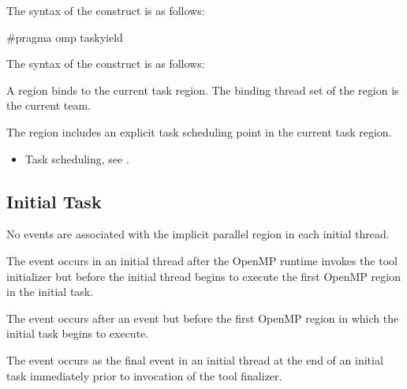 \syntax
\begin{ccppspecific}
The syntax of the  construct is as follows:

\begin{ompcPragma}
#pragma omp taskyield 
\end{ompcPragma}
\end{ccppspecific}

\begin{fortranspecific}
The syntax of the  construct is as follows:

\end{fortranspecific}

\binding
A  region binds to the current task region. The binding thread set of the
 region is the current team.

\descr
The  region includes an explicit task scheduling point in the current task
region.

\crossreferences
\begin{itemize}
\item Task scheduling, see
.
\end{itemize}











\subsection{Initial Task}

\events
No events are associated with the implicit parallel region in each initial thread.

The  event occurs in an initial thread after the OpenMP runtime invokes the tool initializer
but before the initial thread begins to execute the first OpenMP region in the initial task.

The  event occurs after an  event
but before the first OpenMP region in which the initial task begins to execute.

The  event occurs as the final event in an initial thread at the end of an initial task
immediately prior to invocation of the tool finalizer.

